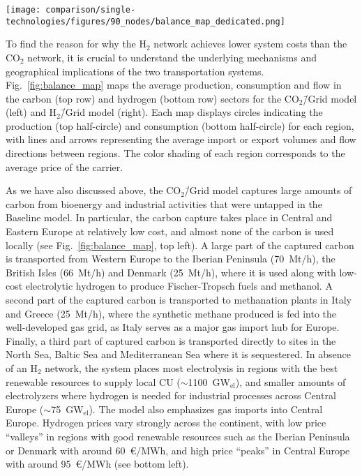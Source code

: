 \documentclass[twocolumn]{article}
\newcommand{\COtwo}{CO$_2$}
\newcommand{\Htwo}{H$_2$}
\newcommand{\modBase}{Baseline model}
\newcommand{\modCO}{CO$_2$\=/Grid model}
\newcommand{\modH}{H$_2$\=/Grid model}
\newcommand{\carbon}{CO$_2$}
\newcommand{\hydrogen}{H$_2$}
\newcommand{\carbonmodel}{CO$_2$\=/Grid model}
\newcommand{\hydrogenmodel}{H$_2$\=/Grid model}
\begin{document}
\begin{figure*}[ht!]
    \centering
    \texttt{[image: comparison/single-technologies/figures/90\_nodes/balance\_map\_dedicated.png]}
    \caption{Optimal operation, flows and prices of the carbon (top line) and hydrogen (bottom line) sectors for the \carbonmodel{} (left) and the \hydrogenmodel{} (right) in the net zero scenario. For each region, upper semicircles show the average production per technology, lower semicircles the consumption, and colors the average marginal prices. Lines and arrows show the interregional transportation. Carbon sequestration offshore are drawn as full circles. \carbon{} and \hydrogen{} transport goes from low price to high price areas to supply CU and, in the case of \carbonmodel{}, CS.
    }
    \label{fig:balance_map}
\end{figure*}

To find the reason for why the \Htwo{} network achieves lower system costs than the \COtwo{} network, it is crucial to understand the underlying mechanisms and geographical implications of the two transportation systems. Fig.~\ref{fig:balance_map} maps the average production, consumption and flow in the carbon (top row) and hydrogen (bottom row) sectors for the \modCO{} (left) and \modH{} (right). Each map displays circles indicating the production (top half-circle) and consumption (bottom half-circle) for each region, with lines and arrows representing the average import or export volumes and flow directions between regions. The color shading of each region corresponds to the average price of the carrier.

As we have also discussed above, the \modCO{} captures large amounts of carbon from bioenergy and industrial activities that were untapped in the \modBase{}. In particular, the carbon capture takes place in Central and Eastern Europe at relatively low cost, and almost none of the carbon is used locally (see Fig.~\ref{fig:balance_map}, top left). A large part of the captured carbon is transported from Western Europe to the Iberian Peninsula (70~Mt/h), the British Isles (66~Mt/h) and Denmark (25~Mt/h), where it is used along with low-cost electrolytic hydrogen to produce Fischer-Tropsch fuels and methanol. A second part of the captured carbon is transported to methanation plants in Italy and Greece (25~Mt/h), where the synthetic methane produced is fed into the well-developed gas grid, as Italy serves as a major gas import hub for Europe. Finally, a third part of captured carbon is transported directly to sites in the North Sea, Baltic Sea and Mediterranean Sea where it is sequestered. In absence of an \Htwo{} network, the system places most electrolysis in regions with the best renewable resources to supply local CU ($\sim$1100~GW$_\text{el}$), and smaller amounts of electrolyzers where hydrogen is needed for industrial processes across Central Europe ($\sim$75~GW$_\text{el}$). The model also emphasizes gas imports into Central Europe. Hydrogen prices vary strongly across the continent, with low price ``valleys'' in regions with good renewable resources such as the Iberian Peninsula or Denmark with around 60~€/MWh, and high price ``peaks'' in Central Europe with around 95~€/MWh (see bottom left).
\end{document}
